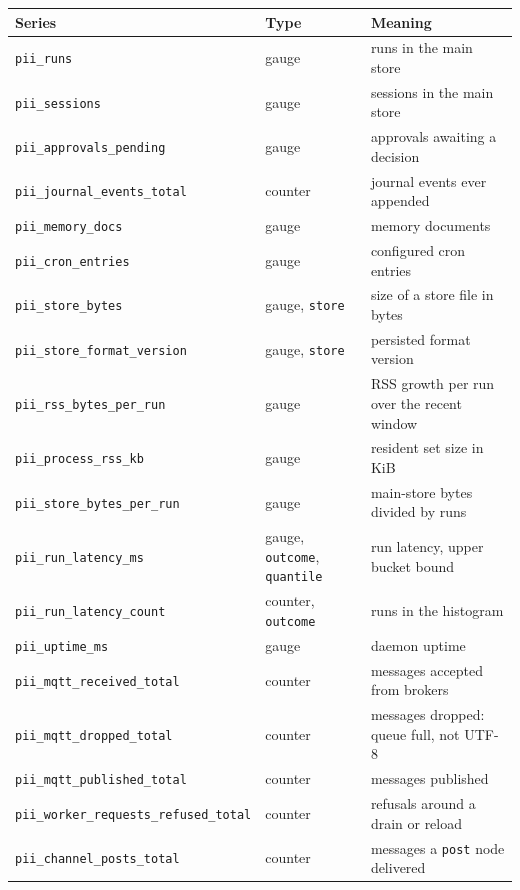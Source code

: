 {\footnotesize
\begin{longtable}{@{}>{\raggedright\arraybackslash}p{}>{\raggedright\arraybackslash}p{}>{\raggedright\arraybackslash}p{}@{}}
  \toprule
  \textbf{Series} & \textbf{Type} & \textbf{Meaning} \\
  \midrule
  \endhead
  \texttt{pii\_runs} & gauge & runs in the main store \\
  \texttt{pii\_sessions} & gauge & sessions in the main store \\
  \texttt{pii\_approvals\_pending} & gauge & approvals awaiting a decision \\
  \texttt{pii\_journal\_events\_total} & counter & journal events ever appended \\
  \texttt{pii\_memory\_docs} & gauge & memory documents \\
  \texttt{pii\_cron\_entries} & gauge & configured cron entries \\
  \texttt{pii\_store\_bytes} & gauge, \texttt{store} & size of a store file in bytes \\
  \texttt{pii\_store\_format\_version} & gauge, \texttt{store} & persisted format version \\
  \texttt{pii\_rss\_bytes\_per\_run} & gauge & RSS growth per run over the recent window \\
  \texttt{pii\_process\_rss\_kb} & gauge & resident set size in KiB \\
  \texttt{pii\_store\_bytes\_per\_run} & gauge & main-store bytes divided by runs \\
  \texttt{pii\_run\_latency\_ms} & gauge, \texttt{outcome}, \texttt{quantile} & run latency,
    upper bucket bound \\
  \texttt{pii\_run\_latency\_count} & counter, \texttt{outcome} & runs in the histogram \\
  \texttt{pii\_uptime\_ms} & gauge & daemon uptime \\
  \texttt{pii\_mqtt\_received\_total} & counter & messages accepted from brokers \\
  \texttt{pii\_mqtt\_dropped\_total} & counter & messages dropped: queue full, not UTF-8 \\
  \texttt{pii\_mqtt\_published\_total} & counter & messages published \\
  \texttt{pii\_worker\_requests\_refused\_total} & counter & refusals around a drain or reload \\
  \texttt{pii\_channel\_posts\_total} & counter & messages a \texttt{post} node delivered \\

\end{longtable}}
